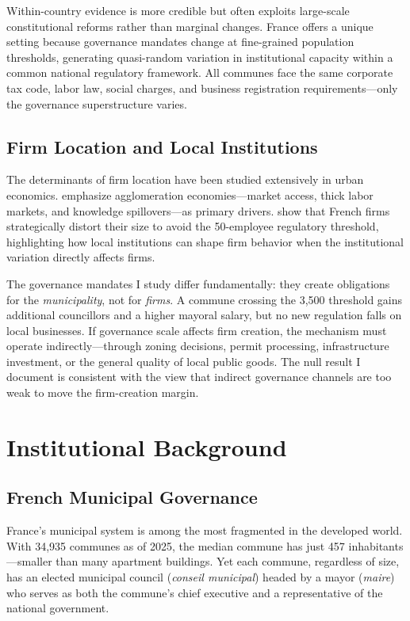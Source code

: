 \documentclass[12pt]{article}
\begin{document}
Within-country evidence is more credible but often exploits large-scale constitutional reforms rather than marginal changes. France offers a unique setting because governance mandates change at fine-grained population thresholds, generating quasi-random variation in institutional capacity within a common national regulatory framework. All communes face the same corporate tax code, labor law, social charges, and business registration requirements---only the governance superstructure varies.

\subsection{Firm Location and Local Institutions}

The determinants of firm location have been studied extensively in urban economics. \citet{duranton2004} emphasize agglomeration economies---market access, thick labor markets, and knowledge spillovers---as primary drivers. \citet{garicano2016} show that French firms strategically distort their size to avoid the 50-employee regulatory threshold, highlighting how local institutions can shape firm behavior when the institutional variation directly affects firms.

The governance mandates I study differ fundamentally: they create obligations for the \textit{municipality}, not for \textit{firms}. A commune crossing the 3,500 threshold gains additional councillors and a higher mayoral salary, but no new regulation falls on local businesses. If governance scale affects firm creation, the mechanism must operate indirectly---through zoning decisions, permit processing, infrastructure investment, or the general quality of local public goods. The null result I document is consistent with the view that indirect governance channels are too weak to move the firm-creation margin.

\section{Institutional Background}

\subsection{French Municipal Governance}

France's municipal system is among the most fragmented in the developed world. With 34,935 communes as of 2025, the median commune has just 457 inhabitants---smaller than many apartment buildings. Yet each commune, regardless of size, has an elected municipal council (\textit{conseil municipal}) headed by a mayor (\textit{maire}) who serves as both the commune's chief executive and a representative of the national government.
\end{document}
